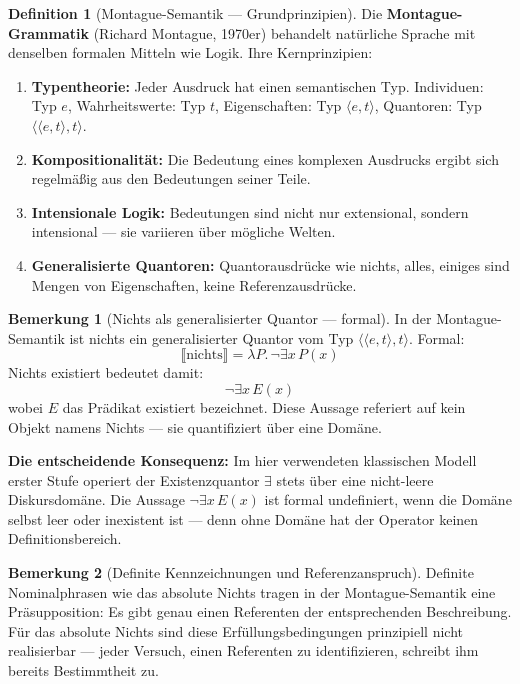 \documentclass[11pt,a4paper]{article}
\theoremstyle{plain}
\theoremstyle{definition}
\newtheorem{definition}{Definition}[section]
\newtheorem{remark}{Bemerkung}[section]
\begin{document}
\begin{definition}[Montague-Semantik --- Grundprinzipien]
Die \textbf{Montague-Grammatik} (Richard Montague, 1970er) behandelt nat\"{u}rliche
Sprache mit denselben formalen Mitteln wie Logik. Ihre Kernprinzipien:
\begin{enumerate}
  \item \textbf{Typentheorie:} Jeder Ausdruck hat einen semantischen Typ.
        Individuen: Typ $e$, Wahrheitswerte: Typ $t$, Eigenschaften:
        Typ $\langle e,t\rangle$, Quantoren: Typ $\langle\langle e,t\rangle,t\rangle$.
  \item \textbf{Kompositionalit\"{a}t:} Die Bedeutung eines komplexen Ausdrucks
        ergibt sich regelm\"{a}\ss{}ig aus den Bedeutungen seiner Teile.
  \item \textbf{Intensionale Logik:} Bedeutungen sind nicht nur extensional, sondern
        intensional --- sie variieren \"{u}ber m\"{o}gliche Welten.
  \item \textbf{Generalisierte Quantoren:} Quantorausdr\"{u}cke wie \glqq{}nichts\grqq{},
        \glqq{}alles\grqq{}, \glqq{}einiges\grqq{} sind Mengen von Eigenschaften,
        keine Referenzausdr\"{u}cke.
\end{enumerate}
\end{definition}

\begin{remark}[\glqq{}Nichts\grqq{} als generalisierter Quantor --- formal]
In der Montague-Semantik ist \glqq{}nichts\grqq{} ein generalisierter Quantor vom
Typ $\langle\langle e,t\rangle,t\rangle$. Formal:
\[
  \llbracket\text{nichts}\rrbracket
  = \lambda P.\, \neg\exists x\, P(x)
\]
\glqq{}Nichts existiert\grqq{} bedeutet damit:
\[
  \neg\exists x\, E(x)
\]
wobei $E$ das Pr\"{a}dikat \glqq{}existiert\grqq{} bezeichnet. Diese Aussage referiert
auf kein Objekt namens \glqq{}Nichts\grqq{} --- sie quantifiziert \"{u}ber eine Dom\"{a}ne.

\textbf{Die entscheidende Konsequenz:} Im hier verwendeten klassischen Modell erster
Stufe operiert der Existenzquantor $\exists$ stets \"{u}ber eine nicht-leere
Diskursdom\"{a}ne. Die Aussage $\neg\exists x\, E(x)$ ist formal undefiniert, wenn
die Dom\"{a}ne selbst leer oder inexistent ist --- denn ohne Dom\"{a}ne hat der
Operator keinen Definitionsbereich.
\end{remark}

\begin{remark}[Definite Kennzeichnungen und Referenzanspruch]
Definite Nominalphrasen wie \glqq{}das absolute Nichts\grqq{} tragen in der
Montague-Semantik eine Pr\"{a}supposition: Es gibt genau einen Referenten der
entsprechenden Beschreibung. F\"{u}r \glqq{}das absolute Nichts\grqq{} sind diese
Erf\"{u}llungsbedingungen prinzipiell nicht realisierbar --- jeder Versuch, einen
Referenten zu identifizieren, schreibt ihm bereits Bestimmtheit zu.
\end{remark}
\end{document}
